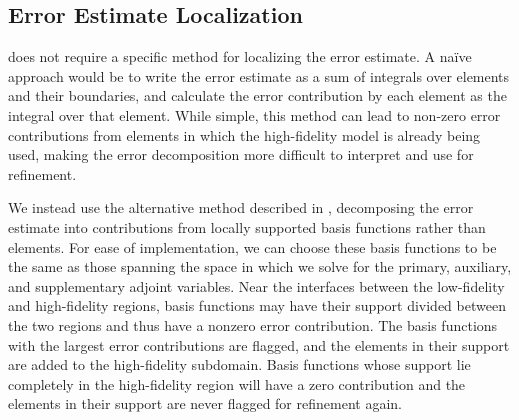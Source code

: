 \documentclass[review]{siamart0516}
\providecommand{\DIFdelend}{} %
\DeclareRobustCommand{\DIFdelend}{\DIFOaddend \let\includegraphics\DIFOincludegraphics} %
\begin{document}

\DIFdelend \subsection{Error Estimate Localization}\label{sec:errLocal}
 does not require a specific method for localizing the error estimate. A na\"{i}ve approach would be to write the error estimate as a sum of integrals over elements and their boundaries, and calculate the error contribution by each element as the integral over that element. While simple, this method can lead to non-zero error contributions from elements in which the high-fidelity model is already being used, making the error decomposition more difficult to interpret and use for refinement.

We instead use the alternative method described in \cite{vanOpstaletal15}, decomposing the error estimate into contributions from locally supported basis functions rather than elements. For ease of implementation, we can choose these basis functions to be the same as those spanning the space in which we solve for the primary, auxiliary, and supplementary adjoint variables. Near the interfaces between the low-fidelity and high-fidelity regions, basis functions may have their support divided between the two regions and thus have a nonzero error contribution. The basis functions with the largest error contributions are flagged, and the elements in their support are added to the high-fidelity subdomain. Basis functions whose support lie completely in the high-fidelity region will have a zero contribution and the elements in their support are never flagged for refinement again.
\end{document}

